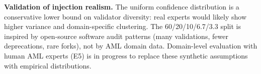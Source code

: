 \textbf{Validation of injection realism.} The uniform confidence distribution is a conservative lower bound on validator diversity: real experts would likely show higher variance and domain-specific clustering. The 60/20/10/6.7/3.3 split is inspired by open-source software audit patterns (many validations, fewer deprecations, rare forks), not by AML domain data. Domain-level evaluation with human AML experts (E5) is in progress to replace these synthetic assumptions with empirical distributions.
